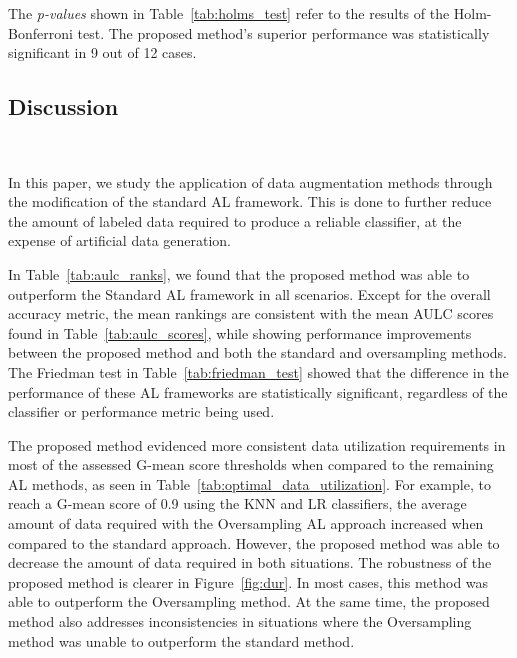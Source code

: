 \documentclass[10pt,journal,compsoc]{IEEEtran}
\begin{document}
The \textit{p-values} shown in Table~\ref{tab:holms_test} refer to the results
of the Holm-Bonferroni test. The proposed method's superior performance was
statistically significant in 9 out of 12 cases. 

\begin{table}
	\centering
    \caption{%
        Adjusted p-values using the Holm-Bonferroni method. Bold values are
        statistically significant at a level of $\alpha = 0.05$. The null
        hypothesis is that the Oversampling or Proposed method does not
        perform better than the control method (Standard AL framework).
    }\label{tab:holms_test}
\end{table}

\subsection{Discussion}~\label{sec:sub_discussion}

In this paper, we study the application of data augmentation methods through
the modification of the standard AL framework. This is done to further reduce
the amount of labeled data required to produce a reliable classifier, at the
expense of artificial data generation.
 
In Table~\ref{tab:aulc_ranks}, we found that the proposed method was able to
outperform the Standard AL framework in all scenarios. Except for the overall
accuracy metric, the mean rankings are consistent with the mean AULC scores
found in Table~\ref{tab:aulc_scores}, while showing performance improvements
between the proposed method and both the standard and oversampling methods.
The Friedman test in Table~\ref{tab:friedman_test} showed that the difference
in the performance of these AL frameworks are statistically significant,
regardless of the classifier or performance metric being used.
 
The proposed method evidenced more consistent data utilization requirements in
most of the assessed G-mean score thresholds when compared to the remaining AL
methods, as seen in Table~\ref{tab:optimal_data_utilization}. For example, to
reach a G-mean score of 0.9 using the KNN and LR classifiers, the average
amount of data required with the Oversampling AL approach increased when
compared to the standard approach. However, the proposed method was able to
decrease the amount of data required in both situations. The robustness of the
proposed method is clearer in Figure~\ref{fig:dur}. In most cases, this method
was able to outperform the Oversampling method. At the same time, the proposed
method also addresses inconsistencies in situations where the Oversampling
method was unable to outperform the standard method.
\end{document}
